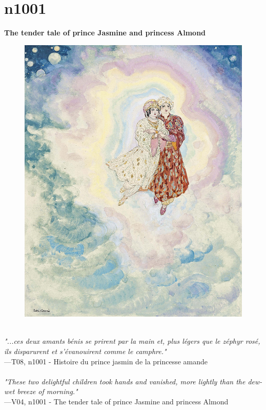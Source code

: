 \documentclass[../Carre_nights.tex]{subfiles}
\begin{document}
\newpage

\section{n1001}
\textbf{\Large{The tender tale of prince Jasmine and princess Almond}} \\

\begin{figure}[ht]
\centering
\includegraphics[height=\figsize]{illustrations/volume_8/T08, n1001 - Histoire du prince jasmin de la princesse amande.jpg}
\end{figure}

\textit{\\
"...ces deux amants bénis se prirent par la main et, plus légers que le zéphyr rosé, ils disparurent et s’évanouirent comme le camphre."} \\
—T08, n1001 - Histoire du prince jasmin de la princesse amande \\~\\
\textit{"These two delightful children took hands and vanished, more lightly than the dew-wet breeze of morning."} \\
—V04, n1001 - The tender tale of prince Jasmine and princess Almond
\end{document}
